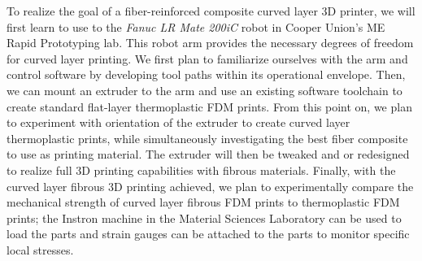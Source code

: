 \documentclass[letter,10pt,english]{article}
\begin{document}

To realize the goal of a fiber-reinforced composite curved layer 3D printer, we will first learn to use to the \emph{Fanuc LR Mate 200iC} robot in Cooper Union's ME Rapid Prototyping lab. This robot arm provides the necessary degrees of freedom for curved layer printing. We first plan to familiarize ourselves with the arm and control software by developing tool paths within its operational envelope. Then, we can mount an extruder to the arm and use an existing software toolchain to create standard flat-layer thermoplastic FDM prints. From this point on, we plan to experiment with orientation of the extruder to create curved layer thermoplastic prints, while simultaneously investigating the best fiber composite to use as printing material. The extruder will then be tweaked and or redesigned to realize full 3D printing capabilities with fibrous materials. Finally, with the curved layer fibrous 3D printing achieved, we plan to experimentally compare the mechanical strength of curved layer fibrous FDM prints to thermoplastic FDM prints; the Instron machine in the Material Sciences Laboratory can be used to load the parts and strain gauges can be attached to the parts to monitor specific local stresses.

\end{document}
